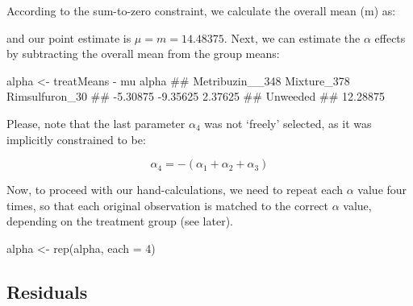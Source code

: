 \documentclass[a4paper,12pt,oneside]{book}
\newenvironment{Shaded}{\begin{snugshade}}{\end{snugshade}}
\newcommand{\DecValTok}[1]{#1}
\newcommand{\SpecialCharTok}[1]{#1}
\newcommand{\DocumentationTok}[1]{#1}
\newcommand{\OtherTok}[1]{#1}
\newcommand{\FunctionTok}[1]{#1}
\newcommand{\AttributeTok}[1]{#1}
\newcommand{\NormalTok}[1]{#1}
\begin{document}
According to the sum-to-zero constraint, we calculate the overall mean (m) as:

\vspace{12pt}

\begin{Shaded}
\end{Shaded}

and our point estimate is \(\mu = m = 14.48375\). Next, we can estimate the \(\alpha\) effects by subtracting the overall mean from the group means:

\vspace{12pt}

\begin{Shaded}
\begin{Highlighting}[]
\NormalTok{alpha }\OtherTok{\textless{}{-}}\NormalTok{ treatMeans }\SpecialCharTok{{-}}\NormalTok{ mu}
\NormalTok{alpha}
\DocumentationTok{\#\# Metribuzin\_\_348     Mixture\_378  Rimsulfuron\_30 }
\DocumentationTok{\#\#        {-}5.30875        {-}9.35625         2.37625 }
\DocumentationTok{\#\#        Unweeded }
\DocumentationTok{\#\#        12.28875}
\end{Highlighting}
\end{Shaded}

Please, note that the last parameter \(\alpha_4\) was not `freely' selected, as it was implicitly constrained to be:

\[\alpha_4 = - \left( \alpha_1 + \alpha_2 + \alpha_3 \right)\]

Now, to proceed with our hand-calculations, we need to repeat each \(\alpha\) value four times, so that each original observation is matched to the correct \(\alpha\) value, depending on the treatment group (see later).

\vspace{12pt}

\begin{Shaded}
\begin{Highlighting}[]
\NormalTok{alpha }\OtherTok{\textless{}{-}} \FunctionTok{rep}\NormalTok{(alpha, }\AttributeTok{each =} \DecValTok{4}\NormalTok{)}
\end{Highlighting}
\end{Shaded}

\hypertarget{residuals}{%
\subsection{Residuals}\label{residuals}}
\end{document}
